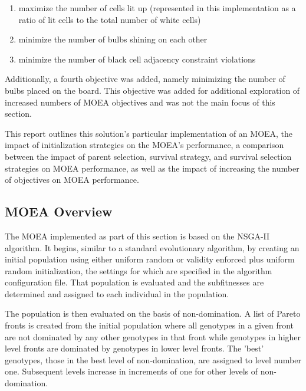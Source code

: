 \documentclass[11pt]{article}
\begin{document}
\begin{enumerate}

    \item maximize the number of cells lit up (represented in this implementation
    as a ratio of lit cells to the total number of white cells)

    \item minimize the number of bulbs shining on each other

    \item minimize the number of black cell adjacency constraint violations

\end{enumerate}

Additionally, a fourth objective was added, namely minimizing the number of bulbs
placed on the board. This objective was added for additional exploration of increased numbers of MOEA
objectives and was not the main focus of this section.

This report outlines this solution's particular
implementation of an MOEA, the impact of initialization strategies on the MOEA's 
performance, a comparison between the impact of parent selection, survival strategy, and survival
selection strategies on MOEA performance, as well as the impact of increasing the
number of objectives on MOEA performance.


\subsection{MOEA Overview}

The MOEA implemented as part of this section is based on the NSGA-II algorithm. It begins,
similar to a standard evolutionary algorithm, by creating an initial population using
either uniform random or validity enforced plus uniform random initialization, the 
settings for which are specified in the algorithm configuration file. That population
is evaluated and the subfitnesses are determined and assigned to each individual 
in the population.

The population is then evaluated on the basis of non-domination. A list of Pareto fronts is created
from the initial population where all genotypes in a given front are not dominated
by any other genotypes in that front while genotypes in higher level fronts are dominated
by genotypes in lower level fronts. The 'best' genotypes, those in the best level
of non-domination, are assigned to level number one. Subsequent levels increase in
increments of one for other levels of non-domination.
\end{document}
